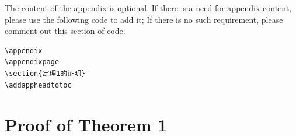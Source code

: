 \documentclass[11pt,en]{elegantpaper}
\begin{document}
The content of the appendix is optional. If there is a need for appendix content, please use the following code to add it; If there is no such requirement, please comment out this section of code.

\begin{lstlisting}
\appendix
\appendixpage
\section{定理1的证明}
\addappheadtotoc
\end{lstlisting}


\printbibliography[heading=bibintoc, title=\ebibname]

\appendix
\appendixpage
\section{Proof of Theorem 1}
\addappheadtotoc
\end{document}

